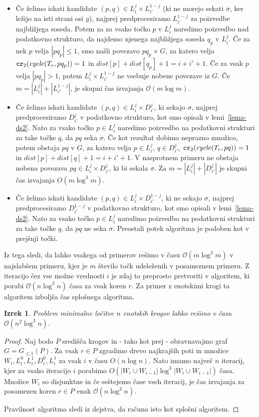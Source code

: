 \documentclass[a4paper, 12pt]{book}
\newcommand{\GG}{\ensuremath{G_{\le 1}}}
\newcommand{\OO}{\ensuremath{\mathcal{O}}} %
\newtheorem{izrek}{Izrek}[chapter]
\def\dist{\mathit{dist}}
\newcommand{\cycle}{\mathit{cycle}}
\newcommand\CR{\mbox{\tt cr}_2}		  %
\begin{document}
\begin{itemize}
\item Če želimo iskati kandidate $(p,q)\in L_i^j\times L_{i'}^{1-j}$ (ki ne morejo sekati $\sigma$, ker ležijo na isti strani osi $y$), najprej predprocesiramo $L_{i'}^{1-j}$ za poizvedbe najbližjega soseda. Potem za za vsako točko $p$ v $L_i^j$ naredimo poizvedbo nad podatkovno strukturo, da najdemo njenega najbližjega soseda $q_p$ v $L_i^j$. Če za nek $p$ velja $|pq_p|\le 1$, smo našli povezavo $pq_p$ v $G$, za katero velja $\CR(\cycle(T_r,pq_p))=1$ in $\dist[p]+\dist[q_p]+1=i+i'+1$. Če za vsak $p$ velja $|pq_p|> 1$, potem $L_i^j\times L_{i'}^{1-j}$ ne vsebuje nobene povezave iz $G$. Če $m=|L_i^j|+|L_{i'}^{1-j}|$, je skupni čas izvajanja $\OO(m\log m)$.
\item Če želimo iskati kandidate $(p,q)\in L_i^j\times D_{i'}^{j}$, ki sekajo $\sigma$, najprej predprocesiramo $D_{i'}^{j}$ v podatkovno strukturo, kot smo opisali v lemi~\ref{lema-ds2}. Nato za vsako točko $p\in L_i^j$ naredimo poizvedbo na podatkovni strukturi za take točke $q$, da $pq$ seka $\sigma$. Če kot rezultat dobimo neprazno množico, potem obstaja $pq$ v $G$, za katero velja $p\in L_i^j$, $q\in D_{i'}^{j}$, $\CR(\cycle(T_r,pq))=1$ in $\dist[p]+\dist[q]+1=i+i'+1$. V nasprotnem primeru ne obstaja nobena povezava $pq\in L_i^j\times D_{i'}^{j}$, ki bi sekala $\sigma$. Za $m=|L_i^j|+|D_{i'}^{j}|$ je skupni čas izvajanja  $O(m\log^3 m)$.
\item Če želimo iskati kandidate $(p,q)\in L_i^j\times D_{i'}^{1-j}$, ki ne sekajo $\sigma$, najprej predprocesiramo $D_{i'}^{1-j}$ v podatkovno strukturo, kot smo opisali v lemi~\ref{lema-ds2}. Nato za vsako točko $p\in L_i^j$ naredimo poizvedbo na podatkovni strukturi za take točke $q$, da $pq$ ne seka $\sigma$. Preostali potek algoritma je podoben kot v prejšnji točki. 
\end{itemize}
Iz tega sledi, da lahko vsakega od primerov rešimo v času $\OO(m\log^3m)$ v najslabšem primeru, kjer je $m$ število točk udeleženih v posameznem primeru. Z iteracijo čez vse možne vrednosti $i$ je zdaj to preprosto pretvoriti v algoritem, ki porabi $\OO(n\log^3n)$ časa za vsak koren $r$. Za primer z enotskimi krogi ta algoritem izboljša čas splošnega algoritma. 
\begin{izrek}
\label{lema4}
Problem minimalne ločitve $n$ enotskih krogov lahko rešimo v času $\OO(n^2\log^3n)$.
\end{izrek}

\begin{proof}
Naj bodo $P$ središča krogov in - tako kot prej - obravnavajmo graf $G=\GG(P)$. Za vsak $r\in P$ zgradimo drevo najkrajših poti in množice $W_i,L_i^0,L_i^1,D_i^0,L_i^1$ za vsak $i$ v času $O(n\log n)$. Nato imamo največ $n$ iteracij, kjer za vsako iteracijo $i$ porabimo $O(|W_i\cup W_{i-1}|\log^3 |W_i\cup W_{i-1}|)$ časa. Množice $W_i$ so disjunktne in če seštejemo čase vseh iteracij, je čas izvajanja za posamezen koren $r\in P$ enak $\OO(n\log^3n)$.

Pravilnost algoritma sledi iz dejstva, da računa isto kot splošni algoritem.
\end{proof}
\end{document}
